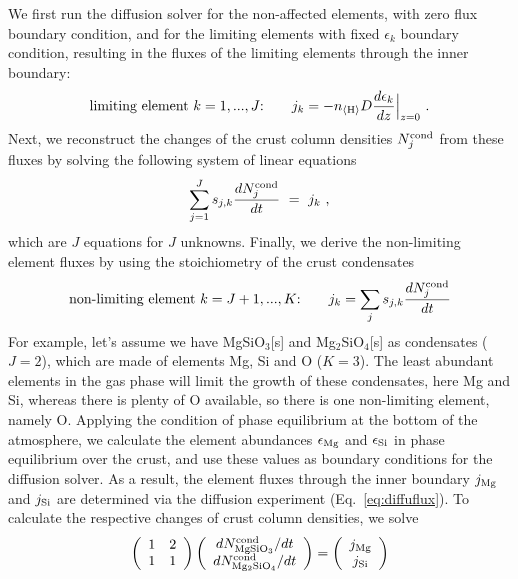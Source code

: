 \documentclass[11pt]{article}
\def\nH{n_{\langle\rm H\rangle}}
\def\ek{\epsilon_k}
\begin{document}
We first run the diffusion solver for the non-affected elements, with
zero flux boundary condition, and for the limiting elements 
with fixed $\ek$ boundary condition, resulting in the fluxes
of the limiting elements through the inner boundary:
\begin{equation}
  \mbox{limiting element $k=1,...,J$:}\quad\quad 
   j_k = -\nH D \frac{d\ek}{dz}\Big|_{z=0} \ .
  \label{eq:diffuflux}
\end{equation}
Next, we reconstruct the changes of the crust column densities
$N_j^{\rm cond}$ from these fluxes by solving the following system of
linear equations
\begin{equation}
  \sum_{j=1}^J s_{j,k} \frac{dN_j^{\rm cond}}{dt} ~=~ j_k \ ,
\end{equation}
which are $J$ equations for $J$ unknowns. Finally, we derive the
non-limiting element fluxes by using the stoichiometry of the 
crust condensates
\begin{equation}
  \mbox{non-limiting element $k=J+1,...,K$:}\quad\quad 
  j_k = \sum_j s_{j,k} \frac{dN_j^{\rm cond}}{dt}
\end{equation}
For example, let's assume we have MgSiO$_3$[s] and Mg$_2$SiO$_4$[s] as
condensates ($J=2$), which are made of elements Mg, Si and O
($K=3$). The least abundant elements in the gas phase will limit the
growth of these condensates, here Mg and Si, whereas there is plenty
of O available, so there is one non-limiting element, namely
O. Applying the condition of phase equilibrium at the bottom of the
atmosphere, we calculate the element abundances $\epsilon_{\rm Mg}$
and $\epsilon_{\rm Si}$ in phase equilibrium over the crust, and use
these values as boundary conditions for the diffusion solver. As a
result, the element fluxes through the inner boundary $j_{\rm Mg}$ and
$j_{\rm Si}$ are determined via the diffusion experiment
(Eq.~\ref{eq:diffuflux}). To calculate the respective changes of crust
column densities, we solve
\begin{equation}
  \left(\begin{array}{cc} 1 & 2 \\ 
                          1 & 1 \end{array}\right)
  \left(\begin{array}{c} dN_{\rm MgSiO_3}^{\rm cond}/dt \\ 
                         dN_{\rm Mg_2SiO_4}^{\rm cond}/dt \end{array}\right)
  = 
  \left(\begin{array}{c} j_{\rm Mg} \\ j_{\rm Si}\end{array}\right)
\end{equation}
\end{document}
